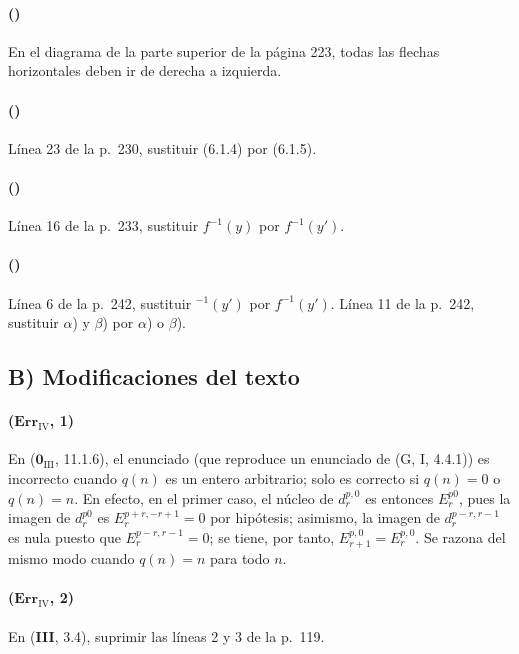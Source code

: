 \paragraph{({\texorpdfstring{\protect{}}{IV, 14.5.11}})}
En el diagrama de la parte superior de la página 223, todas las flechas
horizontales deben ir de derecha a izquierda.

\paragraph{({\texorpdfstring{\protect{}}{IV, 15.4.2}})}
Línea 23 de la p.~230, sustituir (6.1.4) por (6.1.5).

\paragraph{({\texorpdfstring{\protect{}}{IV, 15.5.2}})}
Línea 16 de la p.~233, sustituir $f^{-1}(y)$ por $f^{-1}(y')$.

\paragraph{({\texorpdfstring{\protect{}}{IV, 15.6.10}})}
Línea 6 de la p.~242, sustituir ${}^{-1}(y')$ por $f^{-1}(y')$.
Línea 11 de la p.~242, sustituir $\alpha$) y $\beta$) por
$\alpha$) o $\beta$).

\subsection*{B) Modificaciones del texto}

\paragraph{($\mathbf{Err}_{\mathrm{IV}}$, 1)}
En ($\mathbf{0}_{\mathrm{III}}$, 11.1.6), el enunciado (que reproduce un enunciado de
(G, I, 4.4.1)) es incorrecto cuando $q(n)$ es un entero arbitrario;
solo es correcto si $q(n)=0$ o $q(n)=n$. En efecto, en el
primer caso, el núcleo de $d_r^{p,0}$ es entonces $E_r^{p0}$, pues
la imagen de $d_r^{p0}$ es $E_r^{p+r,-r+1}=0$ por hipótesis; asimismo,
la imagen de $d_r^{p-r,r-1}$ es nula puesto que
$E_r^{p-r,r-1}=0$; se tiene, por tanto, $E_{r+1}^{p,0}=E_r^{p,0}$. Se
razona del mismo modo cuando $q(n)=n$ para todo $n$.

\paragraph{($\mathbf{Err}_{\mathrm{IV}}$, 2)}
En (\textbf{III}, 3.4), suprimir las líneas 2 y 3 de la p.~119.

